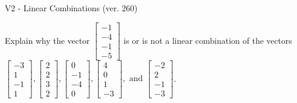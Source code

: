 \begin{exercise}
  \begin{exerciseTitle}V2 - Linear Combinations (ver. 260)\end{exerciseTitle}
  \begin{exerciseStatement}
    Explain why the vector \(\left[\begin{array}{c}
-1 \\
-4 \\
-1 \\
-5
\end{array}\right]\)  is or is not a linear 
	combination of the vectors \(\left[\begin{array}{c}
-3 \\
1 \\
-1 \\
1
\end{array}\right] , \left[\begin{array}{c}
2 \\
2 \\
3 \\
2
\end{array}\right] , \left[\begin{array}{c}
0 \\
-1 \\
-4 \\
0
\end{array}\right] , \left[\begin{array}{c}
4 \\
0 \\
1 \\
-3
\end{array}\right] , \text{ and } \left[\begin{array}{c}
-2 \\
2 \\
-1 \\
-3
\end{array}\right]\).
	



\end{exerciseStatement}
\end{exercise}
